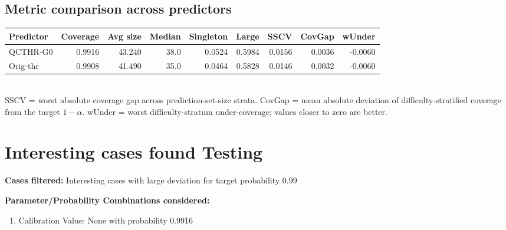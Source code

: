 \documentclass[parskip=half]{scrartcl}
\begin{document}
\subsection{Metric comparison across predictors}
\begin{tabular}{l r r r r r r r r}
\hline
Predictor & Coverage & Avg size & Median & Singleton & Large & SSCV & CovGap & wUnder \\
\hline
QCTHR-G0 & 0.9916 & 43.240 & 38.0 & 0.0524 & 0.5984 & 0.0156 & 0.0036 & -0.0060 \\
Orig-thr & 0.9908 & 41.490 & 35.0 & 0.0464 & 0.5828 & 0.0146 & 0.0032 & -0.0060 \\
\hline
\end{tabular}\\[0.5em]
\textsf{\scriptsize SSCV = worst absolute coverage gap across prediction-set-size strata. CovGap = mean absolute deviation of difficulty-stratified coverage from the target $1-\alpha$. wUnder = worst difficulty-stratum under-coverage; values closer to zero are better.}\\
\section{Interesting cases found Testing}
\textbf{Cases filtered:} Interesting cases with large deviation for target probability 0.99


\textbf{Parameter/Probability Combinations considered:}\begin{enumerate}
\item Calibration Value: None with probability 0.9916
\end{enumerate}
        
\end{document}
